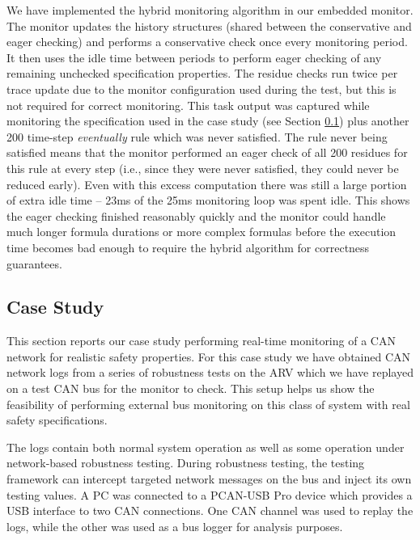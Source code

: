 We have implemented the hybrid monitoring algorithm in our embedded monitor. The monitor updates the history structures (shared between the conservative and eager checking) and performs a conservative check once every monitoring period. It then uses the idle time between periods to perform eager checking of any remaining unchecked specification properties.
%
The residue checks run twice per trace update due to the monitor configuration used during the test, but this is not required for correct monitoring.
This task output was captured while monitoring the specification used in the case study (see Section \ref{sec:case_study}) plus another 200 time-step \emph{eventually} rule which was never satisfied.
The rule never being satisfied means that the monitor performed an eager check of all 200 residues for this rule at every step (i.e., since they were never satisfied, they could never be reduced early).
Even with this excess computation there was still a large portion of extra idle time -- 23ms of the 25ms monitoring loop was spent idle.
This shows the eager checking finished reasonably quickly and the monitor could handle much longer formula durations or more complex formulas before the execution time becomes bad enough to require the hybrid algorithm for correctness guarantees.

\subsection{Case Study}
\label{sec:case_study}
This section reports our case study performing real-time monitoring of a CAN network for realistic safety properties.
For this case study we have obtained CAN network logs from a series of robustness tests on the ARV which we have replayed on a test CAN bus for the monitor to check.
This setup %
helps us show the feasibility of performing external bus monitoring on this class of system with real safety specifications.


The logs contain both normal system operation as well as some operation under network-based robustness testing. During robustness testing, the testing framework can intercept targeted network messages on the bus and inject its own testing values. %
A PC was connected to a PCAN-USB Pro \cite{PCAN-USBPro} device which provides a USB interface to two CAN connections. One CAN channel was used to replay the logs, while the other was used as a bus logger for analysis purposes.

